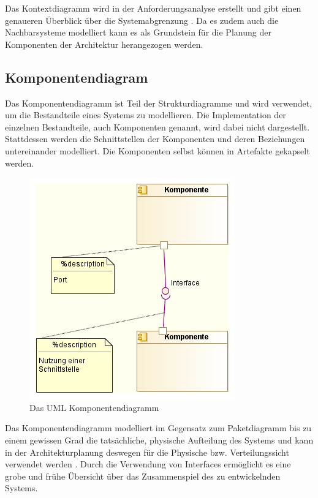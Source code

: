 Das Kontextdiagramm wird in der Anforderungsanalyse erstellt und gibt einen genaueren Überblick über die Systemabgrenzung \cite[S. 255]{glasklar}. Da es zudem auch die Nachbarsysteme modelliert kann es als Grundstein für die Planung der Komponenten der Architektur herangezogen werden.


\subsection{Komponentendiagram}
Das Komponentendiagramm ist Teil der Strukturdiagramme und wird verwendet, um die Bestandteile eines Systems zu modellieren. Die Implementation der einzelnen Bestandteile, auch Komponenten genannt, wird dabei nicht dargestellt. Stattdessen werden die Schnittstellen der Komponenten und deren Beziehungen untereinander modelliert. Die Komponenten selbst können in Artefakte gekapselt werden. \cite[S. 216]{glasklar}

\begin{figure}[H]
    \centering
    \includegraphics[scale=0.8]{uml/modelling/component.png}
    \caption{Das UML Komponentendiagramm}
    \label{fig:umlcomponentmodel}
\end{figure}

Das Komponentendiagramm modelliert im Gegensatz zum Paketdiagramm bis zu einem gewissen Grad die tatsächliche, physische Aufteilung des Systems und kann in der Architekturplanung deswegen für die Physische bzw. Verteilungssicht verwendet werden \cite[S. 223]{glasklar}\cite[S. 139]{basiswissen}. Durch die Verwendung von Interfaces ermöglicht es eine grobe und frühe Übersicht über das Zusammenspiel des zu entwickelnden Systems.

